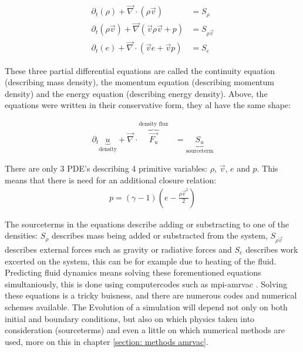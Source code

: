 \begin{align}
 \partial_t \left(\rho \right) + \vec{\nabla} \cdot \left( \rho \vec{v}  \right) &= S_\rho \label{eq: hd_rho}\\
 \partial_t \left(\rho \vec{v} \right) + \vec{\nabla} \left( \vec{v} \rho \vec{v} + p \right) &= S_{\rho \vec{v}} \label{eq: hd_mom}\\
 \partial_t \left(e \right) + \vec{\nabla} \cdot \left( \vec{v} e + \vec{v} p \right) &= S_e \label{eq: hd_e}
\end{align}

These three partial differential equations are called the continuity equation (describing mass density), the momentum equation (describing momentum density) and the energy equation (describing energy density). Above, the equations were written in their conservative form, they al have the same shape:

\begin{align}
	\partial_t \underbrace{u}_\text{density} + \vec{\nabla} \cdot \overbrace{\vec{F_u}}^\text{density flux} &= \underbrace{S_u}_\text{sourceterm} \label{eq: conservative}
\end{align}

There are only 3 PDE's describing 4 primitive variables: $\rho$, $\vec{v}$, $e$ and $p$. This means that there is need for an additional closure relation:
\begin{align}
	p = (\gamma - 1) \left(e - \frac{\rho \vec{v}^2}{2} \right) \label{gas_closing}
\end{align}

The sourceterms in the equations describe adding or substracting to one of the densities: $S_\rho$ describes mass being added or substracted from the system, $S_{\rho \vec{v}}$ describes external forces such as gravity or radiative forces and $S_e$ describes work excerted on the system, this can be for example due to heating of the fluid.\\

Predicting fluid dynamics means solving these forementioned equations simultaniously, this is done using computercodes such as mpi-amrvac \cite{Porth2014}. Solving these equations is a tricky buisness, and there are numerous codes and numerical schemes available. The Evolution of a simulation will depend not only on both initial and boundary conditions, but also on which physics taken into consideration (sourceterms) and even a little on which numerical methods are used, more on this in chapter \ref{section: methods amrvac}. \\

